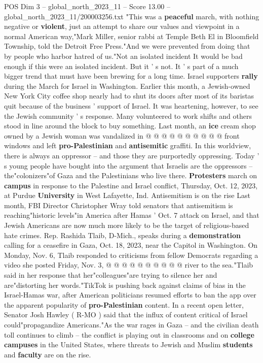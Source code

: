 \begin{textsample}{POS Dim 3 – global\_north\_2023\_11 – Score 13.00 – global\_north\_2023\_11/200003256.txt}  \label{ex:f3_pos_176}
"This was a \textbf{peaceful} march, with nothing negative or \textbf{violent}, just an attempt to share our values and viewpoint in a normal American way,"Mark Miller, senior rabbi at Temple Beth El in Bloomfield Township, told the Detroit Free Press."And we were prevented from doing that by people who harbor hatred of us."Not an isolated incident It would be bad enough if this were an isolated incident.
But it ' s not.
It ' s part of a much bigger trend that must have been brewing for a long time.
Israel supporters \textbf{rally} during the March for Israel in Washington.
Earlier this month, a Jewish-owned New York City coffee shop nearly had to shut its doors after most of its baristas quit because of the business ' support of Israel.
It was heartening, however, to see the Jewish community ' s response.
Many volunteered to work shifts and others stood in line around the block to buy something.
Last month, an \textbf{ice} cream shop owned by a Jewish woman was vandalized in @ @ @ @ @ @ @ @ @ @ front windows and left \textbf{pro-Palestinian} and \textbf{antisemitic} graffiti.
In this worldview, there is always an oppressor -- and those they are purportedly oppressing.
Today ' s young people have bought into the argument that Israelis are the oppressors -- the"colonizers"of Gaza and the Palestinians who live there. \textbf{Protesters} march on \textbf{campus} in response to the Palestine and Israel conflict, Thursday, Oct. 12, 2023, at Purdue \textbf{University} in West Lafayette, Ind.
Antisemitism is on the rise Last month, FBI Director Christopher Wray told senators that antisemitism is reaching"historic levels"in America after Hamas ' Oct. 7 attack on Israel, and that Jewish Americans are now much more likely to be the target of religious-based hate crimes.
Rep.
Rashida Tlaib, D-Mich., speaks during a \textbf{demonstration} calling for a ceasefire in Gaza, Oct. 18, 2023, near the Capitol in Washington.
On Monday, Nov. 6, Tlaib responded to criticisms from fellow Democrats regarding a video she posted Friday, Nov. 3, @ @ @ @ @ @ @ @ @ @ river to the sea."Tlaib said in her response that her"colleagues"are trying to silence her and are"distorting her words."TikTok is pushing back against claims of bias in the Israel-Hamas war, after American politicians resumed efforts to ban the app over the apparent popularity of \textbf{pro-Palestinian} content.
In a recent open letter, Senator Josh Hawley ( R-MO ) said that the influx of content critical of Israel could"propagandize Americans."As the war rages in Gaza -- and the civilian death toll continues to climb -- the conflict is playing out in classrooms and on \textbf{college} \textbf{campuses} in the United States, where threats to Jewish and Muslim \textbf{students} and \textbf{faculty} are on the rise.

\end{textsample}
